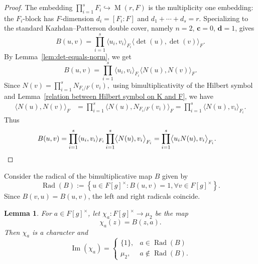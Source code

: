 \documentclass[11pt, a4paper, reqno]{amsart}
\newtheorem{lemma}[theorem]{Lemma}
\theoremstyle{definition}
\theoremstyle{remark}
\theoremstyle{example}
\theoremstyle{note}
\numberwithin{equation}{section}
\DeclareMathOperator{\M}{M}
\DeclareMathOperator{\Rad}{Rad}
\begin{document}
\begin{proof} The embedding $\prod\limits_{i=1}^{s} F_i\hookrightarrow \M(r,F)$ is the multiplicity one
embedding: the $F_i$-block has $F$-dimension
$d_i=[F_i:F]$ and $d_1+\cdots+d_s=r.$  Specializing \cite[Proposition~4.2(5a), formula~(4.10)]{Zou2025}
to the standard Kazhdan--Patterson double cover, namely
$n=2$, $\boldsymbol c=0$, $\boldsymbol d=1$, gives
\begin{equation*}
B(u,v)
=\prod_{i=1}^s \langle u_i,v_i\rangle_{F_i}
\bigl\langle\det(u),\det(v)\bigr\rangle_{F}.
\end{equation*}
By Lemma~\ref{lem:det-equals-norm}, we get
\begin{equation*}
B(u,v)
=\prod_{i=1}^s \langle u_i,v_i\rangle_{F_i}
\bigl\langle N(u),N(v)\bigr\rangle_{F}.
\end{equation*}
Since $N(v)=\prod\limits_{i=1}^{s} N_{F_i/F}(v_i),$ using
bimultiplicativity of the Hilbert symbol and Lemma~\ref{relation between Hilbert symbol on K and F}, we have
\begin{align*}
\bigl\langle N(u),N(v)\bigr\rangle_{F}
&=\prod_{i=1}^{s} \bigl\langle N(u),N_{F_i/F}(v_i)\bigr\rangle_{F}=\prod_{i=1}^{s} \bigl\langle N(u),v_i\bigr\rangle_{F_i}.
\end{align*}
Thus
\begin{align*}
B(u,v)
&=\prod_{i=1}^s \langle u_i,v_i\rangle_{F_i}
\prod_{i=1}^s \bigl\langle N(u),v_i\bigr\rangle_{F_i}=\prod_{i=1}^s\bigl\langle u_iN(u),v_i\bigr\rangle_{F_i}. \qedhere
\end{align*}
\end{proof}
\vspace{0.5 cm}

\noindent Consider the radical of the bimultiplicative map $B$ given by
\begin{equation}\label{Rad(B)}
\Rad(B):=\left\{u\in F[g]^\times:B(u,v)=1, 
\forall v\in F[g]^\times\right\}.
\end{equation}
Since $B(v,u)=B(u,v)$, the left and right radicals
coincide. 


\begin{lemma}\label{lem:image-B} For $a\in F[g]^{\times}$, let $\chi_{a}:F[g]^{\times}\longrightarrow \mu_{2}$ be the map
\[\chi_{a}(z)=B(z,a).\]
Then $\chi_a$ is a character and 
$$\operatorname{Im}(\chi_{a})=\begin{cases}
\{1\}, & a\in\Rad(B)\\
\mu_{2}, & a\notin\Rad(B).
\end{cases}$$
\end{lemma}
\end{document}
